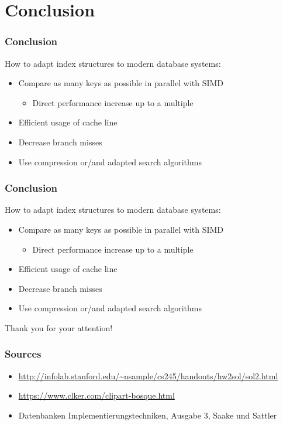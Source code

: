 \documentclass{beamer}
\begin{document}
\section{Conclusion}
\begin{frame}
\frametitle{Conclusion}
How to adapt index structures to modern database systems:
\begin{itemize}
	\item Compare as many keys as possible in parallel with SIMD
	\begin{itemize}
		\item Direct performance increase up to a multiple
	\end{itemize}
	\item Efficient usage of cache line
	\item Decrease branch misses
	\item Use compression or/and adapted search algorithms
	\end{itemize}
\end{frame}

\begin{frame}
\frametitle{Conclusion}
How to adapt index structures to modern database systems:
\begin{itemize}
	\item Compare as many keys as possible in parallel with SIMD
	\begin{itemize}
		\item Direct performance increase up to a multiple
	\end{itemize}
	\item Efficient usage of cache line
	\item Decrease branch misses
	\item Use compression or/and adapted search algorithms
\end{itemize}
\vspace*{\fill}
\begin{center}
	\huge Thank you for your attention!
\end{center}
\end{frame}

\begin{frame}
\frametitle{Sources}
\begin{itemize}
	\item \url{http://infolab.stanford.edu/~nsample/cs245/handouts/hw2sol/sol2.html}
	\item \url{https://www.clker.com/clipart-bosque.html}
	\item Datenbanken Implementierungstechniken, Ausgabe 3, Saake und Sattler
\end{itemize}
\end{frame}
\end{document}
